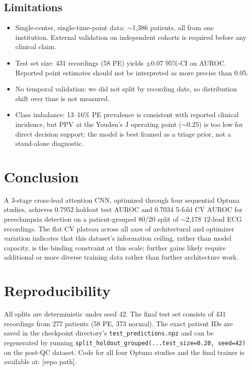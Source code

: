 \documentclass[11pt]{article}
\begin{document}
\subsection{Limitations}

\begin{itemize}
\item Single-center, single-time-point data: $\sim$1,386 patients, all from one institution. External validation on independent cohorts is required before any clinical claim.
\item Test set size: 431 recordings (58 PE) yields $\pm$0.07 95\%-CI on AUROC. Reported point estimates should not be interpreted as more precise than 0.05.
\item No temporal validation: we did not split by recording date, so distribution shift over time is not measured.
\item Class imbalance: 13--16\% PE prevalence is consistent with reported clinical incidence, but PPV at the Youden's J operating point ($\sim$0.25) is too low for direct decision support; the model is best framed as a triage prior, not a stand-alone diagnostic.
\end{itemize}

\section{Conclusion}

A 3-stage cross-lead attention CNN, optimized through four sequential Optuna studies, achieves 0.7952 holdout test AUROC and 0.7034 5-fold CV AUROC for preeclampsia detection on a patient-grouped 80/20 split of $\sim$2,178 12-lead ECG recordings. The flat CV plateau across all axes of architectural and optimizer variation indicates that this dataset's information ceiling, rather than model capacity, is the binding constraint at this scale; further gains likely require additional or more diverse training data rather than further architecture work.

\section*{Reproducibility}

All splits are deterministic under seed 42. The final test set consists of 431 recordings from 277 patients (58 PE, 373 normal). The exact patient IDs are saved in the checkpoint directory's \texttt{test\_predictions.npz} and can be regenerated by running \texttt{split\_holdout\_grouped(...test\_size=0.20, seed=42)} on the post-QC dataset. Code for all four Optuna studies and the final trainer is available at: [repo path].
\end{document}
